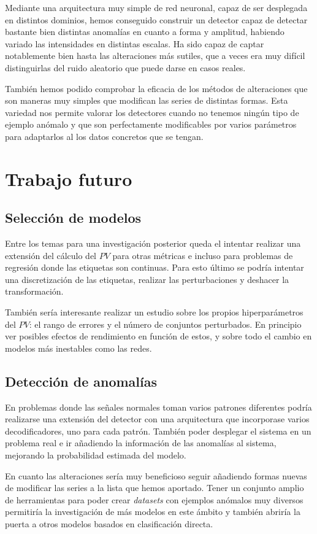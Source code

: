 Mediante una arquitectura muy simple de red neuronal, capaz de ser desplegada en distintos dominios, hemos conseguido construir un detector capaz de detectar bastante bien distintas anomalías en cuanto a forma y amplitud, habiendo variado las intensidades en distintas escalas. Ha sido capaz de captar notablemente bien hasta las alteraciones más sutiles, que a veces era muy difícil distinguirlas del ruido aleatorio que puede darse en casos reales.

También hemos podido comprobar la eficacia de los métodos de alteraciones que son maneras muy simples que modifican las series de distintas formas. Esta variedad nos permite valorar los detectores cuando no tenemos ningún tipo de ejemplo anómalo y que son perfectamente modificables por varios parámetros para adaptarlos al los datos concretos que se tengan.

\section{Trabajo futuro}

\subsection{Selección de modelos}

Entre los temas para una investigación posterior queda el intentar realizar una extensión del cálculo del $PV$ para otras métricas e incluso para problemas de regresión donde las etiquetas son continuas. Para esto último se podría intentar una discretización de las etiquetas, realizar las perturbaciones y deshacer la transformación.

También sería interesante realizar un estudio sobre los propios hiperparámetros del $PV$: el rango de errores y el número de conjuntos perturbados. En principio ver posibles efectos de rendimiento en función de estos, y sobre todo el cambio en modelos más inestables como las redes.

\subsection{Detección de anomalías}

En problemas donde las señales normales toman varios patrones diferentes podría realizarse una extensión del detector con una arquitectura que incorporase varios decodificadores, uno para cada patrón. También poder desplegar el sistema en un problema real e ir añadiendo la información de las anomalías al sistema, mejorando la probabilidad estimada del modelo.

En cuanto las alteraciones sería muy beneficioso seguir añadiendo formas nuevas de modificar las series a la lista que hemos aportado. Tener un conjunto amplio de herramientas para poder crear \emph{datasets} con ejemplos anómalos muy diversos permitiría la investigación de más modelos en este ámbito y también abriría la puerta a otros modelos basados en clasificación directa.

\endinput
